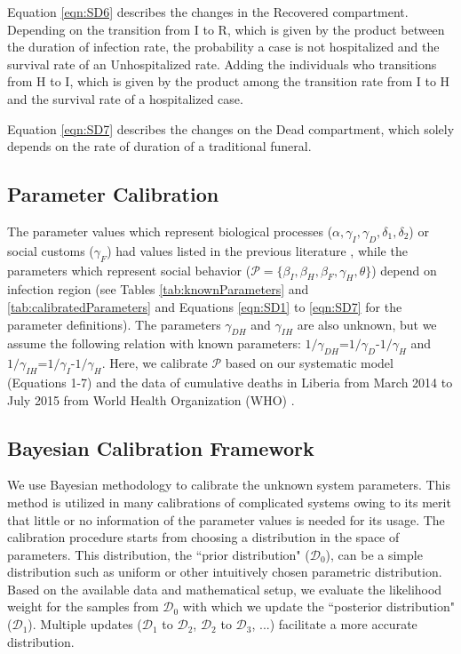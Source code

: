 Equation \ref{eqn:SD6} describes the changes in the Recovered compartment. Depending on the transition from I to R, which is given by the product between the duration of infection rate, the probability a case is not hospitalized and the survival rate of an Unhospitalized rate. Adding  the individuals who transitions from H to I, which is given by the product among the transition rate from I to H and the survival rate of a hospitalized case.

Equation \ref{eqn:SD7} describes the changes on the Dead compartment, which solely depends on the rate of duration of a traditional funeral.\\





\subsection{Parameter Calibration}

The parameter values which represent biological processes ($\alpha, \gamma_{I}, \gamma_{D}, \delta_{1}, \delta_{2}$) or social customs ($\gamma_{F}$) had values listed in the previous literature \cite{Poletto2014, Webb2015}, while the parameters which represent social behavior ($\mathcal{P}=\{\beta_{I}, \beta_{H}, \beta_{F}, \gamma_{H}, \theta\}$) depend on infection region (see Tables \ref{tab:knownParameters} and \ref{tab:calibratedParameters} and Equations \ref{eqn:SD1} to \ref{eqn:SD7} for the parameter definitions). The parameters $\gamma_{DH}$ and $\gamma_{IH}$ are also unknown, but we assume the following relation with known parameters: $1/\gamma_{DH}$=$1/\gamma_{D}$-$1/\gamma_{H}$ and $1/\gamma_{IH}$=$1/\gamma_{I}$-$1/\gamma_{H}$. Here, we calibrate $\mathcal{P}$ based on our systematic model (Equations 1-7) and the data of cumulative deaths in Liberia from March 2014 to July 2015 from World Health Organization (WHO) \cite{CDCData}.


\subsection{Bayesian Calibration Framework}
We use Bayesian methodology to calibrate the unknown system parameters. This method is utilized in many calibrations of complicated systems owing to its merit that little or no information of the parameter values is needed for its usage. The calibration procedure starts from choosing a distribution in the space of parameters. This distribution, the ``prior distribution" ($\mathcal{D}_0$), can be a simple distribution such as uniform or other intuitively chosen parametric distribution. Based on the available data and mathematical setup, we evaluate the likelihood weight for the samples from $\mathcal{D}_0$ with which we update the ``posterior distribution" ($\mathcal{D}_1$). Multiple updates ($\mathcal{D}_1$ to $\mathcal{D}_2$, $\mathcal{D}_2$ to $\mathcal{D}_3$, ...) facilitate a more accurate distribution.

